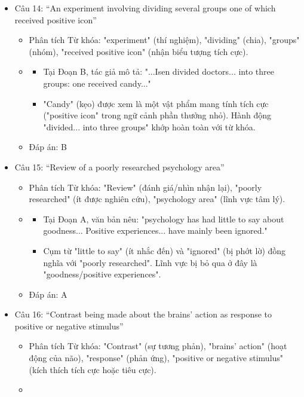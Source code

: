 \documentclass{../templateReading/cdreading}
\begin{document}
\begin{itemize}
\item Câu 14: “An experiment involving dividing several groups one of which received positive icon”
\begin{itemize}
\item Phân tích Từ khóa: "experiment" (thí nghiệm), "dividing" (chia), "groups" (nhóm), "received positive icon" (nhận biểu tượng tích cực).
\item {}
\begin{itemize}
\item Tại Đoạn B, tác giả mô tả: "...Isen divided doctors... into three groups: one received candy..."
\item "Candy" (kẹo) được xem là một vật phẩm mang tính tích cực ("positive icon" trong ngữ cảnh phần thưởng nhỏ). Hành động "divided... into three groups" khớp hoàn toàn với từ khóa.
\end{itemize}
\item Đáp án: B
\end{itemize}
\item Câu 15: “Review of a poorly researched psychology area”
\begin{itemize}
\item Phân tích Từ khóa: "Review" (đánh giá/nhìn nhận lại), "poorly researched" (ít được nghiên cứu), "psychology area" (lĩnh vực tâm lý).
\item {}
\begin{itemize}
\item Tại Đoạn A, văn bản nêu: "psychology has had little to say about goodness... Positive experiences... have mainly been ignored."
\item Cụm từ "little to say" (ít nhắc đến) và "ignored" (bị phớt lờ) đồng nghĩa với "poorly researched". Lĩnh vực bị bỏ qua ở đây là "goodness/positive experiences".
\end{itemize}
\item Đáp án: A
\end{itemize}
\item Câu 16: “Contrast being made about the brains’ action as response to positive or negative stimulus”
\begin{itemize}
\item Phân tích Từ khóa: "Contrast" (sự tương phản), "brains’ action" (hoạt động của não), "response" (phản ứng), "positive or negative stimulus" (kích thích tích cực hoặc tiêu cực).
\item {}

\end{itemize}
\end{itemize}
\end{document}
